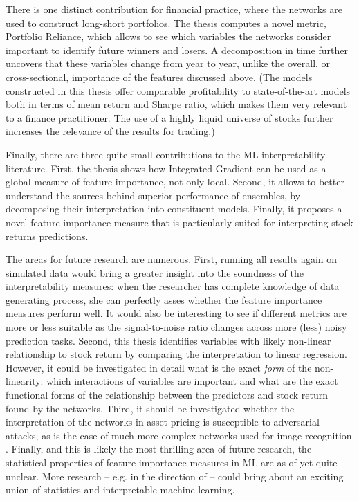 There is one distinct contribution for financial practice, where the networks are used to construct long-short portfolios. The thesis computes a novel metric, Portfolio Reliance, which allows to see which variables the networks consider important to identify future winners and losers. A decomposition in time further uncovers that these variables change from year to year, unlike the overall, or cross-sectional, importance of the features discussed above. (The models constructed in this thesis offer comparable profitability to state-of-the-art models both in terms of mean return and Sharpe ratio, which makes them very relevant to a finance practitioner. The use of a highly liquid universe of stocks further increases the relevance of the results for trading.)   

Finally, there are three quite small contributions to the ML interpretability literature. First, the thesis shows how Integrated Gradient can be used as a global measure of feature importance, not only local. Second, it allows to better understand the sources behind superior performance of ensembles, by decomposing their interpretation into constituent models. Finally, it proposes a novel feature importance measure that is particularly suited for interpreting stock returns predictions. 

The areas for future research are numerous. First, running all results again on simulated data would bring a greater insight into the soundness of the interpretability measures: when the researcher has complete knowledge of data generating process, she can perfectly asses whether the feature importance measures perform well. It would also be interesting to see if different metrics are more or less suitable as the signal-to-noise ratio changes across more (less) noisy prediction tasks. Second, this thesis identifies variables with likely non-linear relationship to stock return by comparing the interpretation to linear regression. However, it could be investigated in detail what is the exact \textit{form} of the non-linearity: which interactions of variables are important and what are the exact functional forms of the relationship between the predictors and stock return found by the networks. Third, it should be investigated whether the interpretation of the networks in asset-pricing is susceptible to adversarial attacks, as is the case of much more complex networks used for image recognition \citep{ghorbani2019interpretation}. Finally, and this is likely the most thrilling area of future research, the statistical properties of feature importance measures in ML are as of yet quite unclear. More research -- e.g. in the direction of \cite{fisher2019all} -- could bring about an exciting union of statistics and interpretable machine learning.   



